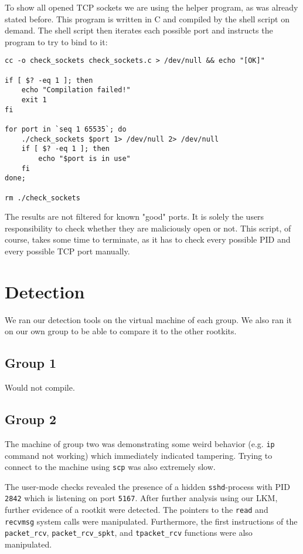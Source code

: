 \documentclass[10pt, letterpaper]{scrartcl}
\begin{document}
To show all opened TCP sockets we are using the helper program, as was already stated before.
This program is written in C and compiled by the shell script on demand.
The shell script then iterates each possible port and instructs the program to try to bind to it:
\begin{lstlisting}
cc -o check_sockets check_sockets.c > /dev/null && echo "[OK]"

if [ $? -eq 1 ]; then
	echo "Compilation failed!"
	exit 1
fi

for port in `seq 1 65535`; do
	./check_sockets $port 1> /dev/null 2> /dev/null
	if [ $? -eq 1 ]; then
		echo "$port is in use"
	fi
done;

rm ./check_sockets
\end{lstlisting}

The results are not filtered for known "good" ports.
It is solely the users responsibility to check whether they are maliciously open or not.
This script, of course, takes some time to terminate, as it has to check every possible PID and every possible TCP port manually.

\section{Detection}\label{sec:detection}
We ran our detection tools on the virtual machine of each group.
We also ran it on our own group to be able to compare it to the other rootkits.
\subsection{Group 1}
Would not compile.

\subsection{Group 2}
The machine of group two was demonstrating some weird behavior (e.g. \texttt{ip} command not working) which immediately indicated tampering.
Trying to connect to the machine using \texttt{scp} was also extremely slow.

The user-mode checks revealed the presence of a hidden \texttt{sshd}-process with PID \texttt{2842} which is listening on port \texttt{5167}.
After further analysis using our LKM, further evidence of a rootkit were detected.
The pointers to the \texttt{read} and \texttt{recvmsg} system calls were manipulated.
Furthermore, the first instructions of the \texttt{packet\_rcv}, \texttt{packet\_rcv\_spkt}, and \texttt{tpacket\_rcv} functions were also manipulated.
\end{document}
